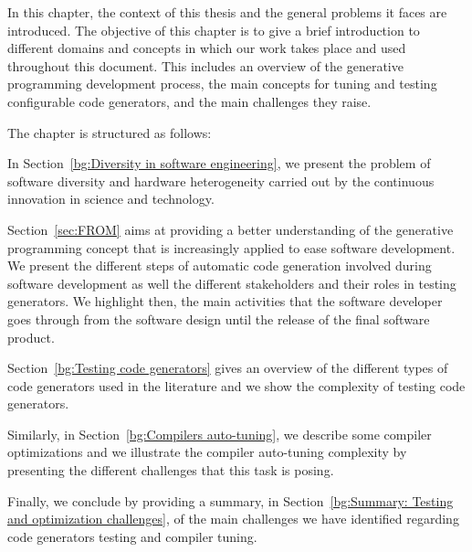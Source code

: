  
In this chapter, the context of this thesis and the general problems it faces are introduced. The objective of this chapter is to give a brief introduction to  different domains and concepts in which our work takes place and used throughout this document.
This includes an overview of the generative programming development process, the main concepts for tuning and testing configurable code generators, and the main challenges they raise.


The chapter is structured as follows: 

In Section~\ref{bg:Diversity in software engineering}, we present the problem of software diversity and hardware heterogeneity carried out by the continuous innovation in science and technology.

Section~\ref{sec:FROM} aims at providing a better understanding of the generative programming concept that is increasingly applied to ease software development. We present the different steps of automatic code generation involved during software development as well  the different stakeholders and their roles in testing generators. We highlight then, the main activities that the software developer goes through from the software design until the release of the final software product.

Section~\ref{bg:Testing code generators} gives an overview of the different types of code generators used in the literature and we show the complexity of testing code generators.

Similarly, in Section~\ref{bg:Compilers auto-tuning}, we describe some compiler optimizations and we illustrate the compiler auto-tuning complexity by presenting the different challenges that this task is posing.

Finally, we conclude by providing a summary, in Section~\ref{bg:Summary: Testing and optimization challenges}, of the main challenges we have identified regarding code generators testing and compiler tuning.

